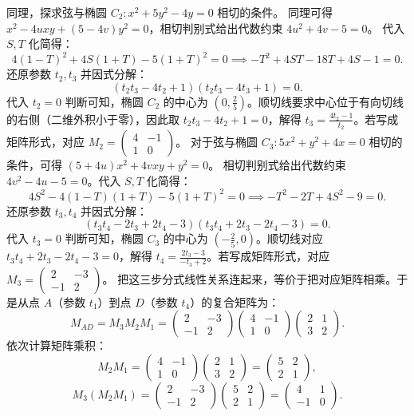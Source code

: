 \begin{solution}
同理，探求弦与椭圆 $C_2: x^2 + 5y^2 - 4y = 0$ 相切的条件。
同理可得 $x^2 - 4uxy + (5-4v)y^2 = 0$，相切判别式给出代数约束 $4u^2 + 4v - 5 = 0$。
代入 $S, T$ 化简得：
\[
4(1-T)^2 + 4S(1+T) - 5(1+T)^2 = 0 \implies -T^2 + 4ST - 18T + 4S - 1 = 0.
\]
还原参数 $t_2, t_3$ 并因式分解：
\[
(t_2t_3 - 4t_2 + 1)(t_2t_3 - 4t_3 + 1) = 0.
\]
代入 $t_2 = 0$ 判断可知，椭圆 $C_2$ 的中心为 $\left(0, \frac{2}{5}\right)$。顺切线要求中心位于有向切线的右侧（二维外积小于零），因此取 $t_2t_3 - 4t_2 + 1 = 0$，解得 $t_3 = \frac{4t_2-1}{t_2}$。若写成矩阵形式，对应 $M_2 = \begin{pmatrix} 4 & -1 \\ 1 & 0 \end{pmatrix}$。
对于弦与椭圆 $C_3: 5x^2 + y^2 + 4x = 0$ 相切的条件，可得 $(5+4u)x^2 + 4vxy + y^2 = 0$。
相切判别式给出代数约束 $4v^2 - 4u - 5 = 0$。代入 $S, T$ 化简得：
\[
4S^2 - 4(1-T)(1+T) - 5(1+T)^2 = 0 \implies -T^2 - 2T + 4S^2 - 9 = 0.
\]
还原参数 $t_3, t_4$ 并因式分解：
\[
(t_3t_4 - 2t_3 + 2t_4 - 3)(t_3t_4 + 2t_3 - 2t_4 - 3) = 0.
\]
代入 $t_3 = 0$ 判断可知，椭圆 $C_3$ 的中心为 $\left(-\frac{2}{5}, 0\right)$。顺切线对应 $t_3t_4 + 2t_3 - 2t_4 - 3 = 0$，解得 $t_4 = \frac{2t_3-3}{-t_3+2}$。若写成矩阵形式，对应 $M_3 = \begin{pmatrix} 2 & -3 \\ -1 & 2 \end{pmatrix}$。
把这三步分式线性关系连起来，等价于把对应矩阵相乘。于是从点 $A$（参数 $t_1$）到点 $D$（参数 $t_4$）的复合矩阵为：
\[
M_{AD} = M_3 M_2 M_1 = \begin{pmatrix} 2 & -3 \\ -1 & 2 \end{pmatrix} \begin{pmatrix} 4 & -1 \\ 1 & 0 \end{pmatrix} \begin{pmatrix} 2 & 1 \\ 3 & 2 \end{pmatrix}.
\]
依次计算矩阵乘积：
\[
M_2 M_1 = \begin{pmatrix} 4 & -1 \\ 1 & 0 \end{pmatrix} \begin{pmatrix} 2 & 1 \\ 3 & 2 \end{pmatrix} = \begin{pmatrix} 5 & 2 \\ 2 & 1 \end{pmatrix},
\]
\[
M_3 (M_2 M_1) = \begin{pmatrix} 2 & -3 \\ -1 & 2 \end{pmatrix} \begin{pmatrix} 5 & 2 \\ 2 & 1 \end{pmatrix} = \begin{pmatrix} 4 & 1 \\ -1 & 0 \end{pmatrix}.
\]
\end{solution}
